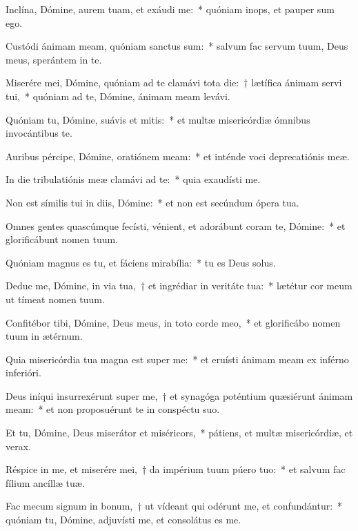 \item Inclína, Dómine, aurem tuam, et exáudi me:~* quóniam inops, et pauper sum ego.

\item Custódi ánimam meam, quóniam sanctus sum:~* salvum fac servum tuum, Deus meus, sperántem in te.

\item Miserére mei, Dómine, quóniam ad te clamávi tota die:~† lætífica ánimam servi tui,~* quóniam ad te, Dómine, ánimam meam levávi.

\item Quóniam tu, Dómine, suávis et mitis:~* et multæ misericórdiæ ómnibus invocántibus te.

\item Auribus pércipe, Dómine, oratiónem meam:~* et inténde voci deprecatiónis meæ.

\item In die tribulatiónis meæ clamávi ad te:~* quia exaudísti me.

\item Non est símilis tui in diis, Dómine:~* et non est secúndum ópera tua.

\item Omnes gentes quascúmque fecísti, vénient, et adorábunt coram te, Dómine:~* et glorificábunt nomen tuum.

\item Quóniam magnus es tu, et fáciens mirabília:~* tu es Deus solus.

\item Deduc me, Dómine, in via tua,~† et ingrédiar in veritáte tua:~* lætétur cor meum ut tímeat nomen tuum.

\item Confitébor tibi, Dómine, Deus meus, in toto corde meo,~* et glorificábo nomen tuum in ætérnum.

\item Quia misericórdia tua magna est super me:~* et eruísti ánimam meam ex inférno inferióri.

\item Deus iníqui insurrexérunt super me,~† et synagóga poténtium quæsiérunt ánimam meam:~* et non proposuérunt te in conspéctu suo.

\item Et tu, Dómine, Deus miserátor et miséricors,~* pátiens, et multæ misericórdiæ, et verax.

\item Réspice in me, et miserére mei,~† da impérium tuum púero tuo:~* et salvum fac fílium ancíllæ tuæ.

\item Fac mecum signum in bonum,~† ut vídeant qui odérunt me, et confundántur:~* quóniam tu, Dómine, adjuvísti me, et consolátus es me.
